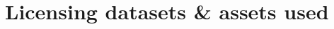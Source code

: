 \documentclass{article}
\newcommand{\set}[1]{\mathcal{#1}}
\newcommand{\danique}[1]{\textcolor{blue}{#1}}
\begin{document}


\section{Licensing datasets \& assets used}
\end{document}
